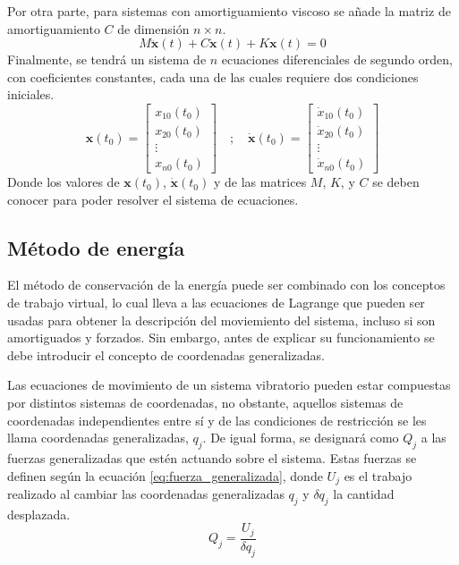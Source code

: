 Por otra parte, para sistemas con amortiguamiento viscoso se añade la matriz de amortiguamiento $\mathit{C}$ de dimensión $n \times n$. 
\begin{equation}\label{eq:multi_degreedamp}
	\mathit{M}\mathbf{\ddot{x}}(t) + \mathit{C}\mathbf{\dot{x}}(t) + \mathit{K}\mathbf{x}(t) = 0	
\end{equation}
Finalmente, se tendrá un sistema de $n$ ecuaciones diferenciales de segundo orden, con coeficientes constantes, cada una de las cuales requiere dos condiciones iniciales.
\begin{equation}
	\mathbf{x}(t_0) = \begin{bmatrix}
	x_{10}(t_0)\\
	x_{20}(t_0)\\
	\vdots\\
	x_{n0}(t_0)
	\end{bmatrix} \quad ; \quad \mathbf{\dot{x}}(t_0) = \begin{bmatrix}
	\dot{x}_{10}(t_0)\\
	\dot{x}_{20}(t_0)\\
	\vdots\\
	\dot{x}_{n0}(t_0)
	\end{bmatrix}
\end{equation}
Donde los valores de $\mathbf{x}(t_0)$, $\mathbf{\dot{x}}(t_0)$ y de las matrices $\mathit{M}$, $\mathit{K}$, y $\mathit{C}$ se deben conocer para poder resolver el sistema de ecuaciones. 

\subsection{Método de energía}
\label{sec:metodo_energia}
El método de conservación de la energía puede ser combinado con los conceptos de trabajo virtual, lo cual lleva a las ecuaciones de Lagrange que pueden ser usadas para obtener la descripción del moviemiento del sistema, incluso si son amortiguados y forzados. Sin embargo, antes de explicar su funcionamiento se debe introducir el concepto de coordenadas generalizadas.

Las ecuaciones de movimiento de un sistema vibratorio pueden estar compuestas por distintos sistemas de coordenadas, no obstante, aquellos sistemas de coordenadas independientes entre sí y de las condiciones de restricción se les llama coordenadas generalizadas, $q_j$. De igual forma, se designará como $Q_j$ a las fuerzas generalizadas que estén actuando sobre el sistema. Estas fuerzas se definen según la ecuación \ref{eq:fuerza_generalizada}, donde $U_j$ es el trabajo realizado al cambiar las coordenadas generalizadas $q_j$ y $\delta q_j$ la cantidad desplazada. 
\begin{equation}\label{eq:fuerza_generalizada}
	Q_j = \frac{U_j}{\delta q_j}
\end{equation} 

